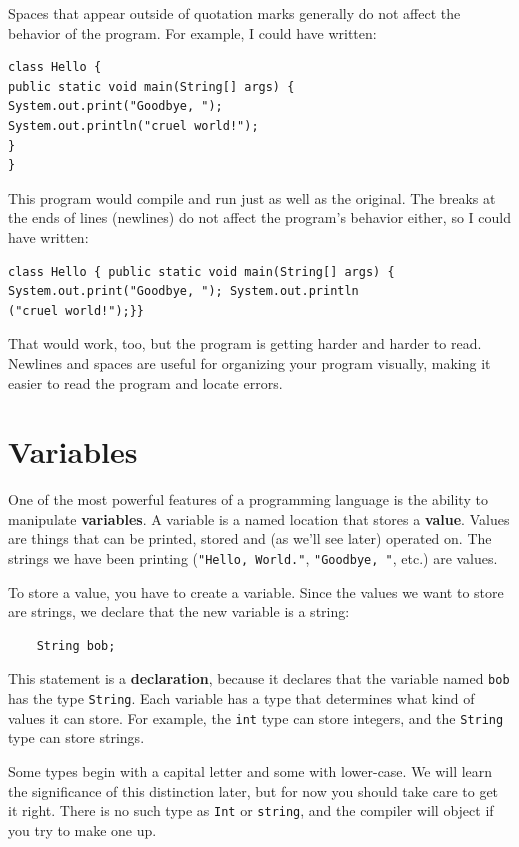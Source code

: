 Spaces that appear outside of quotation marks generally do
not affect the behavior of the program.  For example, I
could have written:

\begin{lstlisting}
class Hello {
public static void main(String[] args) {
System.out.print("Goodbye, ");
System.out.println("cruel world!");
}
}
\end{lstlisting}
%
This program would compile and run just as well as the original.
The breaks at the ends of lines (newlines) do not affect
the program's behavior either, so I could have written:

\begin{lstlisting}
class Hello { public static void main(String[] args) {
System.out.print("Goodbye, "); System.out.println
("cruel world!");}}
\end{lstlisting}
%
That would work, too, but
the program is getting harder and harder to read.  Newlines and
spaces are useful for organizing your program visually, making
it easier to read the program and locate errors.


\section {Variables}

One of the most powerful features of a programming language is the
ability to manipulate {\bf variables}.  A variable is a named location
that stores a {\bf value}.  Values are things that can be printed, stored
and (as we'll see later) operated on.  The strings we have been
printing ({\tt "Hello, World."}, {\tt "Goodbye, "}, etc.)  are values.

To store a value, you have to create a variable.  Since
the values we want to store are strings, we declare that
the new variable is a string:

\begin{lstlisting}
    String bob;
\end{lstlisting}
%
This statement is a {\bf declaration}, because it declares that the
variable named {\tt bob} has the type {\tt String}.  Each variable
has a type that determines what kind of values it can store.  For
example, the {\tt int} type can store integers, and the {\tt String}
type can store strings.


Some types begin with a capital letter and some
with lower-case.  We will learn the significance of this distinction
later, but for now you should take care to get it right.  There is no
such type as {\tt Int} or {\tt string}, and the compiler will object
if you try to make one up.

